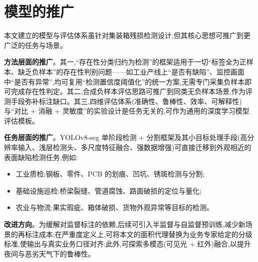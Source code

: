 \section{模型的推广}

本文建立的模型与评估体系虽针对集装箱残损检测设计,但其核心思想可推广到更广泛的任务与场景。

\textbf{方法层面的推广}。其一,“存在性分类归约为检测”的框架适用于一切“标签全为正样本、缺乏负样本”的存在性判别问题——如工业产线上“是否有缺陷”、监控画面中“是否有异常”,均可复用“检测置信度阈值化”的统一方案,无需专门采集负样本即可完成存在性判定。其二,合成负样本评估思路可推广到同类无负样本场景,作为评测手段弥补标注缺口。其三,四维评估体系(准确性、鲁棒性、效率、可解释性)与“对比 + 消融 + 灵敏度”的实验设计是任务无关的,可作为通用的深度学习模型评估模板。

\textbf{任务层面的推广}。YOLOv8-seg 单阶段检测 + 分割框架及其小目标处理手段(高分辨率输入、浅层检测头、多尺度特征融合、强数据增强)可直接迁移到外观相近的表面缺陷检测任务,例如:
\begin{itemize}
\item 工业质检:钢板、零件、PCB 的划痕、凹坑、锈斑检测与分割;
\item 基础设施巡检:桥梁裂缝、管道腐蚀、路面破损的定位与量化;
\item 农业与物流:果实瑕疵、箱体破损、货物外观异常等目标的检测。
\end{itemize}

\textbf{改进方向}。为缓解对监督标注的依赖,后续可引入半监督与自监督预训练,减少新场景的再标注成本;在严重度定义上,可将本文的面积代理替换为业务专家给定的分级标准,使输出与真实业务口径对齐;此外,可探索多模态(可见光 + 红外)融合,以提升夜间与恶劣天气下的鲁棒性。
